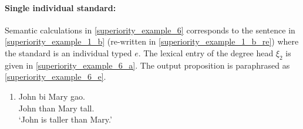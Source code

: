 \documentclass{ctexart}
\begin{document}
\paragraph{Single individual standard:}

Semantic calculations in \ref{superiority_example_6} corresponds to the sentence in \ref{superiority_example_1_b} (re-written in \ref{superiority_example_1_b_re}) where the standard is an individual typed $e$. The lexical entry of the degree head $\xi_2$ is given in \ref{superiority_example_6_a}. The output proposition is paraphrased as \ref{superiority_example_6_e}.

\begin{enumerate}
    \item \label{superiority_example_1_b_re}
    John \enspace bi \enspace Mary gao. \\
    John than Mary tall. \\
    `John is taller than Mary.'
\end{enumerate}
\end{document}
